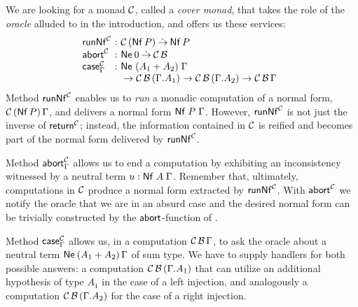 \documentclass[sigplan,screen,fleqn,review]{acmart} %
\begin{document}
We are looking for a monad $\C$, called a \emph{cover monad}, that
takes the role of the \emph{oracle} alluded to in the introduction,
and offers us these services:
\[
\begin{array}{l@{~}c@{~}l@{\quad}l}
\trunNf[\C] & : & \C\,(\tNf\, P) \todot \tNf\, P
\\
\tabort^\C & : & \tNe\, \tyzero \todot \C\,\B
\\
\tcase^\C_\Gamma & : & \Ne {(A_1 + A_2)} \Gamma
\\
  && {} \to \C\,\B\,(\cext \Gamma {A_1})
  \to \C\,\B\,(\cext \Gamma {A_2})
  \to \C\,\B\,\Gamma
\\
\end{array}
\]
Method $\trunNf[\C]$ enables us to \emph{run} a monadic computation of
a normal form, $\C\,(\tNf\,P)\,\Gamma$, and delivers a normal form
$\Nf P \Gamma$.  However, $\trunNf[\C]$ is not just the inverse of
$\treturn[\C]$; instead, the information contained in $\C$ is reified and
becomes part of the normal form delivered by $\trunNf[\C]$.

Method $\tabort^\C_\Gamma$ allows us to end a computation by exhibiting an
inconsistency witnessed by a neutral term $u : \Nf A \Gamma$.
Remember that, ultimately, computations in $\C$ produce a normal form
extracted by $\trunNf[\C]$.  With $\tabort^\C$ we notify the oracle
that we are in an absurd case and the desired normal form can be
trivially constructed by the $\tabort$-function of .

Method $\tcase^\C_\Gamma$ allows us, in a computation
$\C\,\B\,\Gamma$,
to ask the oracle about a neutral
term $\NeP{A_1 + A_2}\Gamma$ of sum type.  We have to supply
handlers for both possible answers:
a computation $\C\,\B\,(\cext\Gamma{A_1})$ that can utilize an
additional hypothesis of type $A_1$ in the case of a left injection,
and analogously a computation $\C\,\B\,(\cext\Gamma{A_2})$ for the
case of a right injection.
\end{document}

